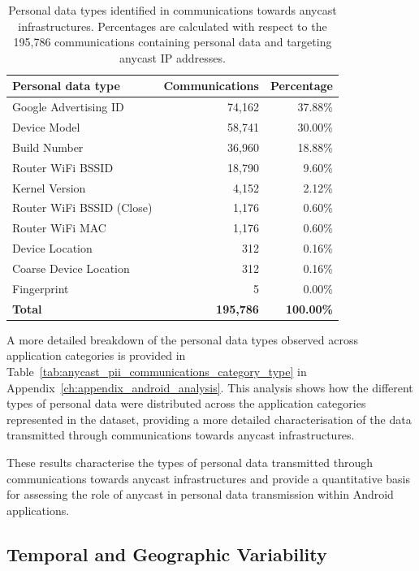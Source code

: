 \documentclass[
A4paper,                %
twoside,                %
openright,              %
chapterprefix=true,     %
12pt,                   %
headings=normal,        %
titlepage=on            %
]{book}
\begin{document}
\begin{table}[ht]
    \centering
    \small
    \caption{Personal data types identified in communications towards anycast infrastructures. Percentages are calculated with respect to the 195,786 communications containing personal data and targeting anycast IP addresses.}
    \label{tab:anycast_pii_communications_type}
    \begin{tabular}{lrr}
        \toprule
        \textbf{Personal data type} & \textbf{Communications} & \textbf{Percentage} \\
        \midrule
        Google Advertising ID & 74,162 & 37.88\% \\
        Device Model & 58,741 & 30.00\% \\
        Build Number & 36,960 & 18.88\% \\
        Router WiFi BSSID & 18,790 & 9.60\% \\
        Kernel Version & 4,152 & 2.12\% \\
        Router WiFi BSSID (Close) & 1,176 & 0.60\% \\
        Router WiFi MAC & 1,176 & 0.60\% \\
        Device Location & 312 & 0.16\% \\
        Coarse Device Location & 312 & 0.16\% \\
        Fingerprint & 5 & 0.00\% \\
        \midrule
        \textbf{Total} & \textbf{195,786} & \textbf{100.00\%} \\
        \bottomrule
    \end{tabular}
\end{table}

A more detailed breakdown of the personal data types observed across application categories is provided in Table~\ref{tab:anycast_pii_communications_category_type} in Appendix~\ref{ch:appendix_android_analysis}. This analysis shows how the different types of personal data were distributed across the application categories represented in the dataset, providing a more detailed characterisation of the data transmitted through communications towards anycast infrastructures.

These results characterise the types of personal data transmitted through communications towards anycast infrastructures and provide a quantitative basis for assessing the role of anycast in personal data transmission within Android applications.

\subsection{Temporal and Geographic Variability}
\label{sc:anycast_experiments_variability}
\end{document}
